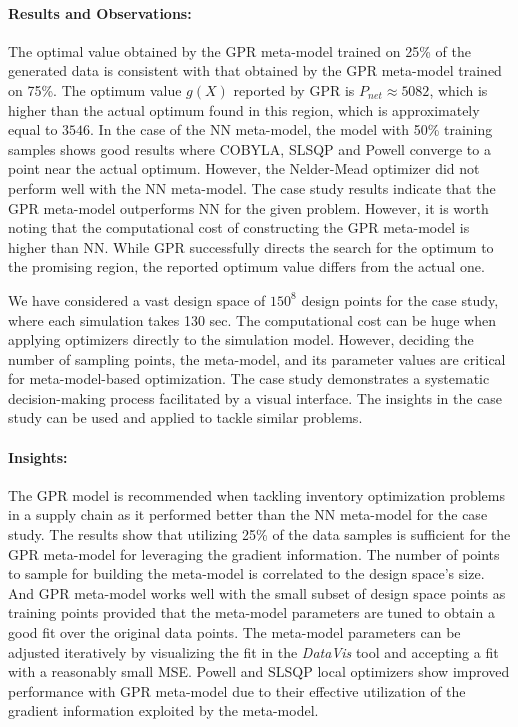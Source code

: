 \paragraph{Results and Observations:} 
The optimal value obtained by the GPR meta-model trained on 25\% of the generated data is consistent with that obtained by the GPR meta-model trained on 75\%. The optimum value $g(X)$ reported by GPR is $P_{net} \approx 5082$, which is higher than the actual optimum found in this region, which is approximately equal to $3546$.  In the case of the NN meta-model, the model with 50\% training samples shows good results where COBYLA, SLSQP and Powell converge to a point near the actual optimum. However, the Nelder-Mead optimizer did not perform well with the NN meta-model. The case study results indicate that the GPR meta-model outperforms NN for the given problem. However, it is worth noting that the computational cost of constructing the GPR meta-model is higher than NN. While GPR successfully directs the search for the optimum to the promising region, the reported optimum value differs from the actual one.

We have considered a vast design space of $150^8$ design points for the case study, where each simulation takes 130 sec. The computational cost can be huge when applying optimizers directly to the simulation model. However, deciding the number of sampling points, the meta-model, and its parameter values are critical for meta-model-based optimization. The case study demonstrates a systematic decision-making process facilitated by a visual interface. The insights in the case study can be used and applied to tackle similar problems. 

\paragraph{Insights:} The GPR model is recommended when tackling inventory optimization problems in a supply chain as it performed better than the NN meta-model for the case study. The results show that utilizing 25\% of the data samples is sufficient for the GPR meta-model for leveraging the gradient information. The number of points to sample for building the meta-model is correlated to the design space's size. And GPR meta-model works well with the small subset of design space points as training points provided that the meta-model parameters are tuned to obtain a good fit over the original data points. The meta-model parameters can be adjusted iteratively by visualizing the fit in the \textit{DataVis} tool and accepting a fit with a reasonably small MSE. Powell and SLSQP local optimizers show improved performance with GPR meta-model due to their effective utilization of the gradient information exploited by the meta-model.

